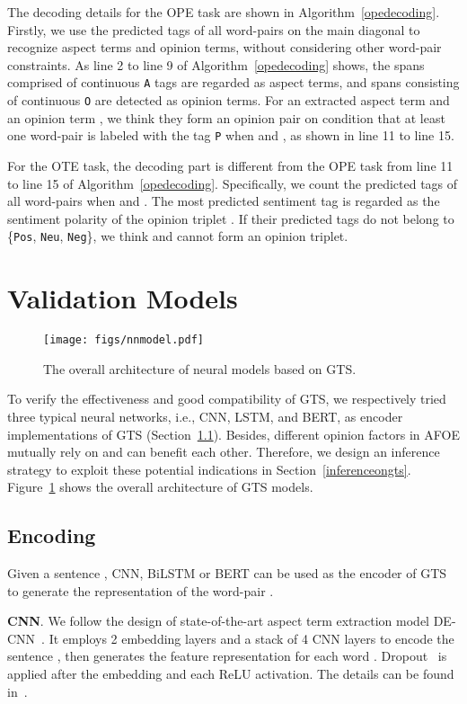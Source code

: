 \documentclass[11pt,a4paper]{article}
\begin{document}
The decoding details for the OPE task are shown in Algorithm~\ref{opedecoding}. Firstly, we use the predicted tags of all  word-pairs on the main diagonal to recognize aspect terms and opinion terms, without considering other word-pair constraints. As line 2 to line 9 of Algorithm~\ref{opedecoding} shows, the spans comprised of continuous \texttt{A} tags are regarded as aspect terms, and spans consisting of continuous \texttt{O} are detected as opinion terms. For an extracted aspect term  and an opinion term , we think they form an opinion pair on condition that at least one word-pair  is labeled with the tag \texttt{P} when  and , as shown in line 11 to line 15.

For the OTE task, the decoding part is different from the OPE task from line 11 to line 15 of Algorithm~\ref{opedecoding}. Specifically, we count the predicted tags of all word-pairs  when  and . The most predicted sentiment tag  is regarded as the sentiment polarity of the opinion triplet . If their predicted tags do not belong to \{\texttt{Pos}, \texttt{Neu}, \texttt{Neg}\}, we think  and  cannot form an opinion triplet.

\section{Validation Models}
\label{validationmodels}
\begin{figure}[t]
	\centering
	\texttt{[image: figs/nnmodel.pdf]}
	\caption{The overall architecture of neural models based on GTS.}
	\label{model}
\end{figure} 

To verify the effectiveness and good compatibility of GTS, we respectively tried three typical neural networks, i.e., CNN, LSTM, and BERT, as encoder implementations of GTS (Section~\ref{encoding}). Besides, different opinion factors in AFOE mutually rely on and can benefit each other. Therefore, we design an inference strategy to exploit these potential indications in Section~\ref{inferenceongts}. Figure~\ref{model} shows the overall architecture of GTS models.

\subsection{Encoding}
\label{encoding}
Given a sentence , CNN, BiLSTM or BERT can be used as the encoder of GTS to generate the representation  of the word-pair .

\textbf{CNN}. We follow the design of state-of-the-art aspect term extraction model DE-CNN~\cite{DBLP:conf/acl/XuLSY18}. It employs 2 embedding layers and a stack of 4 CNN layers to encode the sentence , then generates the feature representation  for each word . Dropout~\cite{DBLP:journals/jmlr/SrivastavaHKSS14} is applied after the embedding and each ReLU activation. The details can be found in~. 
\end{document}
